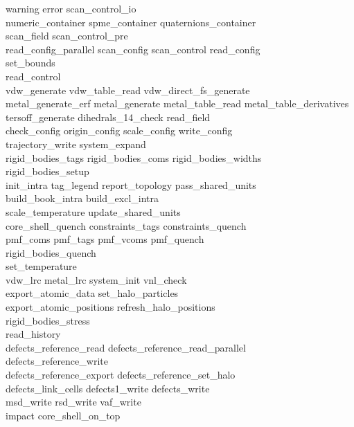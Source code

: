 \begin{itemize}
{\sc
warning error scan\_control\_io \\
numeric\_container spme\_container quaternions\_container \\
scan\_field scan\_control\_pre \\
read\_config\_parallel scan\_config scan\_control read\_config \\
set\_bounds \\
read\_control \\
vdw\_generate vdw\_table\_read vdw\_direct\_fs\_generate \\
metal\_generate\_erf metal\_generate metal\_table\_read metal\_table\_derivatives \\
tersoff\_generate dihedrals\_14\_check read\_field \\
check\_config origin\_config scale\_config write\_config \\
trajectory\_write system\_expand \\
rigid\_bodies\_tags rigid\_bodies\_coms rigid\_bodies\_widths \\
rigid\_bodies\_setup \\
init\_intra tag\_legend report\_topology pass\_shared\_units \\
build\_book\_intra build\_excl\_intra \\
scale\_temperature update\_shared\_units \\
core\_shell\_quench constraints\_tags constraints\_quench \\
pmf\_coms pmf\_tags pmf\_vcoms pmf\_quench \\
rigid\_bodies\_quench \\
set\_temperature \\
vdw\_lrc metal\_lrc system\_init vnl\_check \\
export\_atomic\_data set\_halo\_particles \\
export\_atomic\_positions refresh\_halo\_positions \\
rigid\_bodies\_stress \\
read\_history \\
defects\_reference\_read defects\_reference\_read\_parallel \\
defects\_reference\_write \\
defects\_reference\_export defects\_reference\_set\_halo \\
defects\_link\_cells defects1\_write defects\_write \\
msd\_write rsd\_write vaf\_write \\
impact core\_shell\_on\_top \\
}
\end{itemize}
